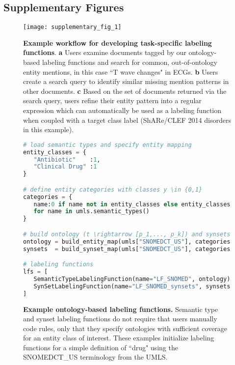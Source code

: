 \documentclass{article}
\begin{document}
\subsection*{Supplementary Figures}

\begin{figure}[H]
  \centering
  \texttt{[image: supplementary\_fig\_1]}
  \caption{\label{fig:rules} \textbf{Example workflow for developing task-specific labeling functions}. 
  \textbf{a} Users examine documents tagged by  our ontology-based labeling functions and search for common, out-of-ontology entity mentions, in this case ``T wave changes" in ECGs. 
  \textbf{b} Users create a search query to identify similar missing mention patterns in other documents. 
  \textbf{c} Based on the set of documents returned via the search query, users refine their entity pattern into a regular expression which can automatically be used as a labeling function when coupled with a target class label (ShARe/CLEF 2014 disorders in this example).}
\end{figure}

\begin{figure}[H]
\centering
\begin{lstlisting}[language=Python]
# load semantic types and specify entity mapping
entity_classes = {
   "Antibiotic"    :1, 
   "Clinical Drug" :1
}

# define entity categories with classes y \in {0,1}
categories = {
   name:0 if name not in entity_classes else entity_classes[name] 
   for name in umls.semantic_types()
}

# build ontology (t \rightarrow [p_1,..., p_k]) and synsets ({\hat{t}_1,...,\hat{t}_n})
ontology = build_entity_map(umls["SNOMEDCT_US"], categories) 
synsets  = build_synset_map(umls["SNOMEDCT_US"], categories)

# labeling functions
lfs = [
   SemanticTypeLabelingFunction(name="LF_SNOMED", ontology),
   SynSetLabelingFunction(name="LF_SNOMED_synsets", synsets)
]
\end{lstlisting}
\caption{\textbf{Example ontology-based labeling functions.}
Semantic type and synset labeling functions do not require that users manually code rules, only that they specify ontologies with sufficient coverage for an entity class of interest. These examples initialize labeling functions for a simple definition of ``drug" using the SNOMEDCT\_US terminology from the UMLS.
}
\end{figure}
\end{document}
